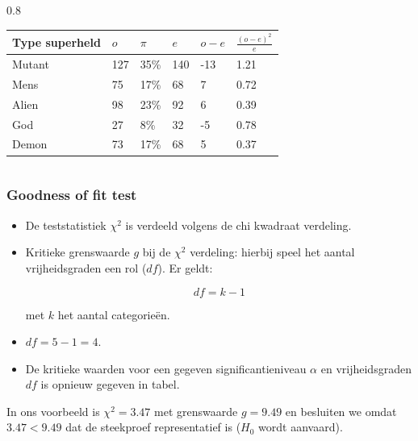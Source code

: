 \documentclass[aspectratio=169]{beamer}
\begin{document}
\begin{frame}
\begin{columns}
    \begin{column} { 0.8 \textwidth}
\begin{table}[h]
\begin{tabular}{@{}llllll@{}}
\toprule
\textbf{Type superheld} & \textbf{$o$} & \textbf{$\pi$} & \textbf{$e$} & \textbf{$o -e$} & \textbf{$\frac{(o-e)^{2}}{e}$} \\ \midrule
Mutant                  & 127          & 35\%           & 140          & -13             & 1.21                           \\
Mens                    & 75           & 17\%           & 68           & 7               & 0.72                           \\
Alien                   & 98           & 23\%           & 92           & 6               & 0.39                           \\
God                     & 27           & 8\%            & 32           & -5              & 0.78                           \\
Demon                   & 73           & 17\%           & 68           & 5               & 0.37                           \\ \bottomrule
\end{tabular}
\end{table}
    \end{column}
  \end{columns}
\end{frame}


\begin{frame}
  \frametitle{Goodness of fit test}

  \begin{itemize}
    \item De teststatistiek $\chi^{2}$ is verdeeld volgens de chi kwadraat verdeling.
    \item Kritieke grenswaarde $g$ bij de $\chi^{2}$ verdeling: hierbij speel het aantal vrijheidsgraden een rol ($df$). Er geldt:

\[ df = k -1 \]

met $k$ het aantal categorie\"en.
\item $df = 5-1 = 4$.
\item De kritieke waarden voor een gegeven significantieniveau $\alpha$ en vrijheidsgraden $df$ is opnieuw gegeven in tabel.
  \end{itemize}
In ons voorbeeld is $\chi^{2} = 3.47$ met grenswaarde $g = 9.49$ en besluiten we omdat $3.47 < 9.49$ dat de steekproef representatief is ($H_0$ wordt aanvaard).
\end{frame}
\end{document}
